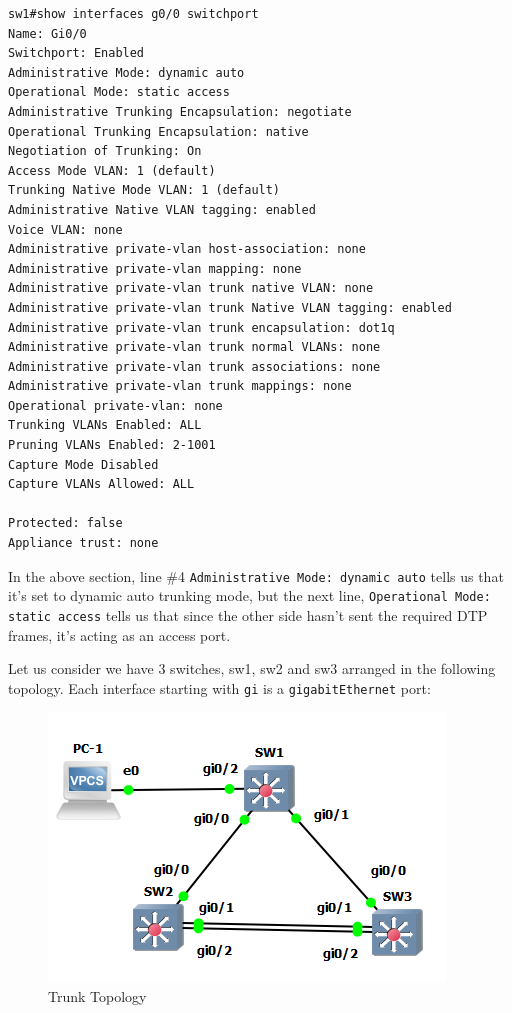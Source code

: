 \vspace{-15pt}
\begin{verbatim}
sw1#show interfaces g0/0 switchport
Name: Gi0/0
Switchport: Enabled
Administrative Mode: dynamic auto
Operational Mode: static access
Administrative Trunking Encapsulation: negotiate
Operational Trunking Encapsulation: native
Negotiation of Trunking: On
Access Mode VLAN: 1 (default)
Trunking Native Mode VLAN: 1 (default)
Administrative Native VLAN tagging: enabled
Voice VLAN: none
Administrative private-vlan host-association: none
Administrative private-vlan mapping: none
Administrative private-vlan trunk native VLAN: none
Administrative private-vlan trunk Native VLAN tagging: enabled
Administrative private-vlan trunk encapsulation: dot1q
Administrative private-vlan trunk normal VLANs: none
Administrative private-vlan trunk associations: none
Administrative private-vlan trunk mappings: none
Operational private-vlan: none
Trunking VLANs Enabled: ALL
Pruning VLANs Enabled: 2-1001
Capture Mode Disabled
Capture VLANs Allowed: ALL

Protected: false
Appliance trust: none
\end{verbatim}
\vspace{-10pt}

\noindent
In the above section, line \#4 \verb|Administrative Mode: dynamic auto| tells us that it's set to dynamic auto trunking mode, but the next line, \verb|Operational Mode: static access| tells us that since the other side hasn't sent the required DTP frames, it's acting as an access port. 

Let us consider we have 3 switches, sw1, sw2 and sw3 arranged in the following topology. Each interface starting with \verb|gi| is a \verb|gigabitEthernet| port:

\begin{figure}[H]
	\centering
	\includegraphics[width=0.57\linewidth]{"ICND1/1. Switches/chapters/3.4.a Trunk Topology"}
	\caption{Trunk Topology}
	\label{fig:3.4.a}
\end{figure}

